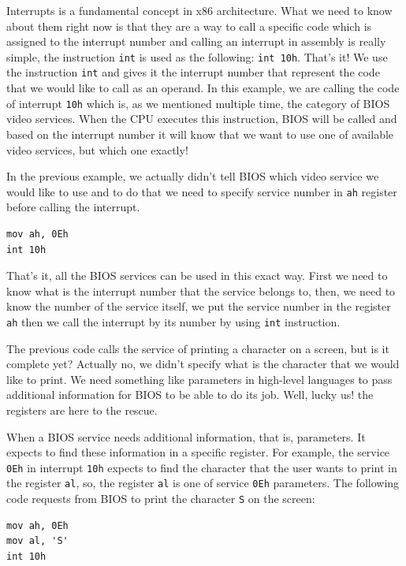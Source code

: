 Interrupts is a fundamental concept in x86 architecture. What we need to
know about them right now is that they are a way to call a specific code
which is assigned to the interrupt number and calling an interrupt in
assembly is really simple, the instruction \lstinline!int! is used as
the following: \lstinline!int 10h!. That's it! We use the instruction
\lstinline!int! and gives it the interrupt number that represent the
code that we would like to call as an operand. In this example, we are
calling the code of interrupt \lstinline!10h! which is, as we mentioned
multiple time, the category of BIOS video services. When the CPU
executes this instruction, BIOS will be called and based on the
interrupt number it will know that we want to use one of available video
services, but which one exactly!

In the previous example, we actually didn't tell BIOS which video
service we would like to use and to do that we need to specify service
number in \lstinline!ah! register before calling the interrupt.

\begin{lstlisting}
mov ah, 0Eh
int 10h
\end{lstlisting}

That's it, all the BIOS services can be used in this exact way. First we
need to know what is the interrupt number that the service belongs to,
then, we need to know the number of the service itself, we put the
service number in the register \lstinline!ah! then we call the interrupt
by its number by using \lstinline!int! instruction.

The previous code calls the service of printing a character on a screen,
but is it complete yet? Actually no, we didn't specify what is the
character that we would like to print. We need something like parameters
in high-level languages to pass additional information for BIOS to be
able to do its job. Well, lucky us! the registers are here to the
rescue.

When a BIOS service needs additional information, that is, parameters.
It expects to find these information in a specific register. For
example, the service \lstinline!0Eh! in interrupt \lstinline!10h!
expects to find the character that the user wants to print in the
register \lstinline!al!, so, the register \lstinline!al! is one of
service \lstinline!0Eh! parameters. The following code requests from
BIOS to print the character \lstinline!S! on the screen:

\begin{lstlisting}
mov ah, 0Eh
mov al, 'S'
int 10h
\end{lstlisting}

